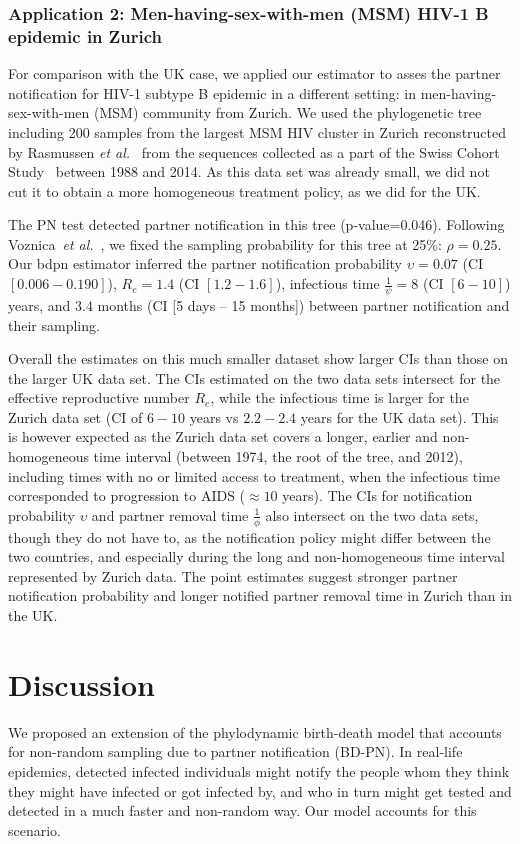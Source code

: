 \documentclass[10pt,letterpaper]{article}
\begin{document}
\subsubsection*{Application 2: Men-having-sex-with-men (MSM) HIV-1 B epidemic in Zurich}
For comparison with the UK case, we applied our estimator to asses the partner notification for HIV-1 subtype B epidemic in a different setting: in men-having-sex-with-men (MSM) community from Zurich.  We used the phylogenetic tree including 200 samples from the largest MSM HIV cluster in Zurich reconstructed by Rasmussen \textit{et al.}~\cite{Rasmussen2017} from the sequences collected as a part of the Swiss Cohort Study~\cite{swisshivcohortstudyCohortProfileSwiss2010a} between 1988 and 2014. As this data set was already small, we did not cut it to obtain a more homogeneous treatment policy, as we did for the UK.

The PN test detected partner notification in this tree (p-value=0.046). Following Voznica~\textit{et al.}~\cite{Voznica2021}, we fixed the sampling probability for this tree at 25\%: $\rho=0.25$. Our bdpn estimator inferred the partner notification probability $\upsilon=0.07$ (CI $[0.006-0.190]$),  
$R_e = 1.4$ (CI $[1.2-1.6]$), infectious time $\frac{1}{\psi} = 8$ (CI $[6-10]$) years, and 3.4 months (CI [5 days -- 15 months]) between partner notification and their sampling. 

Overall the estimates on this much smaller dataset show larger CIs than those on the larger UK data set. The CIs estimated on the two data sets intersect for the effective reproductive number $R_e$, while the infectious time is larger for the Zurich data set (CI of $6-10$ years vs $2.2-2.4$ years for the UK data set). This is however expected as the Zurich data set covers a longer, earlier and non-homogeneous time interval (between 1974, the root of the tree, and 2012), including times with no or limited access to treatment, when the infectious time corresponded to progression to AIDS ($\approx 10$ years). The CIs for notification probability $\upsilon$ and partner removal time $\frac{1}{\phi}$ also intersect on the two data sets, though they do not have to, as the notification policy might differ between the two countries, and especially during the long and non-homogeneous time interval represented by Zurich data. The point estimates suggest stronger partner notification probability and longer notified partner removal time in Zurich than in the UK.


\section*{Discussion}
We proposed an extension of the phylodynamic birth-death model that accounts for non-random sampling due to partner notification (BD-PN). In real-life epidemics, detected infected individuals might notify the people whom they think they might have infected or got infected by, and who in turn might get tested and detected in a much faster and non-random way. Our model accounts for this scenario.
\end{document}
